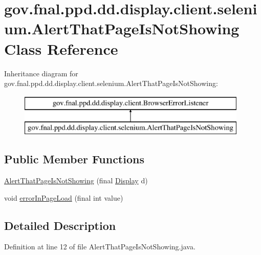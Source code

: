 \hypertarget{classgov_1_1fnal_1_1ppd_1_1dd_1_1display_1_1client_1_1selenium_1_1AlertThatPageIsNotShowing}{\section{gov.\-fnal.\-ppd.\-dd.\-display.\-client.\-selenium.\-Alert\-That\-Page\-Is\-Not\-Showing Class Reference}
\label{classgov_1_1fnal_1_1ppd_1_1dd_1_1display_1_1client_1_1selenium_1_1AlertThatPageIsNotShowing}
}
Inheritance diagram for gov.\-fnal.\-ppd.\-dd.\-display.\-client.\-selenium.\-Alert\-That\-Page\-Is\-Not\-Showing\-:\begin{figure}[H]
\begin{center}
\leavevmode
\includegraphics[height=2.000000cm]{classgov_1_1fnal_1_1ppd_1_1dd_1_1display_1_1client_1_1selenium_1_1AlertThatPageIsNotShowing}
\end{center}
\end{figure}
\subsection*{Public Member Functions}
\begin{DoxyCompactItemize}
\item 
\hyperlink{classgov_1_1fnal_1_1ppd_1_1dd_1_1display_1_1client_1_1selenium_1_1AlertThatPageIsNotShowing_a4f9d56ae893432d34ccce59a15af49c1}{Alert\-That\-Page\-Is\-Not\-Showing} (final \hyperlink{interfacegov_1_1fnal_1_1ppd_1_1dd_1_1signage_1_1Display}{Display} d)
\item 
void \hyperlink{classgov_1_1fnal_1_1ppd_1_1dd_1_1display_1_1client_1_1selenium_1_1AlertThatPageIsNotShowing_a2830890a7364d6ce4a328cda1a784fa0}{error\-In\-Page\-Load} (final int value)
\end{DoxyCompactItemize}


\subsection{Detailed Description}


Definition at line 12 of file Alert\-That\-Page\-Is\-Not\-Showing.\-java.



